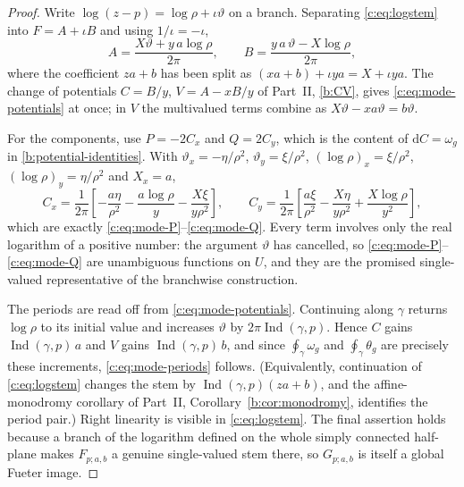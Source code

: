 \documentclass[11pt,a4paper]{article}
\numberwithin{equation}{section}
\theoremstyle{definition}
\theoremstyle{remark}
\theoremstyle{plain}
\DeclareMathOperator{\Ind}{Ind}
\newcommand{\om}{\omega}
\newcommand{\thet}{\theta}
\newcommand{\pot}{C}          %
\newcommand{\potV}{V}         %
\newcommand{\dd}{\mathrm d}
\begin{document}
\begin{proof}
Write $\log(z-p)=\log\rho+\iota\vartheta$ on a branch.  Separating
\eqref{c:eq:logstem} into $F=A+\iota B$ and using $1/\iota=-\iota$,
\[
  A=\frac{X\vartheta+y\,a\log\rho}{2\pi},
  \qquad
  B=\frac{y\,a\,\vartheta-X\log\rho}{2\pi},
\]
where the coefficient $za+b$ has been split as $(xa+b)+\iota ya=X+\iota ya$.
The change of potentials $\pot=B/y$, $\potV=A-xB/y$ of Part~II, \eqref{b:CV}, gives
\eqref{c:eq:mode-potentials} at once; in $\potV$ the multivalued terms
combine as $X\vartheta-xa\vartheta=b\vartheta$.

For the components, use $P=-2\pot_x$ and $Q=2\pot_y$, which is the content of $\dd\pot=\om_g$ in \eqref{b:potential-identities}.  With
$\vartheta_x=-\eta/\rho^2$, $\vartheta_y=\xi/\rho^2$,
$(\log\rho)_x=\xi/\rho^2$, $(\log\rho)_y=\eta/\rho^2$ and $X_x=a$,
\[
  \pot_x=\frac{1}{2\pi}\left[-\frac{a\eta}{\rho^2}-\frac{a\log\rho}{y}
      -\frac{X\xi}{y\rho^2}\right],
  \qquad
  \pot_y=\frac{1}{2\pi}\left[\frac{a\xi}{\rho^2}
      -\frac{X\eta}{y\rho^2}+\frac{X\log\rho}{y^2}\right],
\]
which are exactly \eqref{c:eq:mode-P}--\eqref{c:eq:mode-Q}.  Every term
involves only the real logarithm of a positive number: the argument
$\vartheta$ has cancelled, so \eqref{c:eq:mode-P}--\eqref{c:eq:mode-Q}
are unambiguous functions on $U$, and they are the promised single-valued
representative of the branchwise construction.

The periods are read off from \eqref{c:eq:mode-potentials}.  Continuing
along $\gamma$ returns $\log\rho$ to its initial value and increases
$\vartheta$ by $2\pi\Ind(\gamma,p)$.  Hence $\pot$ gains
$\Ind(\gamma,p)\,a$ and $\potV$ gains $\Ind(\gamma,p)\,b$, and since
$\oint_\gamma\om_g$ and $\oint_\gamma\thet_g$ are precisely these
increments, \eqref{c:eq:mode-periods} follows.  (Equivalently, continuation
of \eqref{c:eq:logstem} changes the stem by $\Ind(\gamma,p)(za+b)$, and
the affine-monodromy corollary of Part~II, Corollary~\ref{b:cor:monodromy}, identifies the period pair.)
Right linearity is visible in \eqref{c:eq:logstem}.  The final assertion
holds because a branch of the logarithm defined on the whole simply
connected half-plane makes $F_{p;a,b}$ a genuine single-valued stem
there, so $G_{p;a,b}$ is itself a global Fueter image.
\end{proof}
\end{document}
